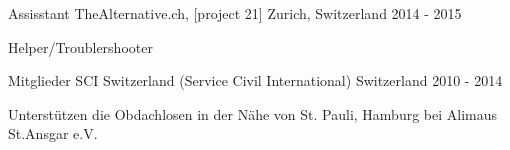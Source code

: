 \begin{cventries}
\cventry
    {Assisstant} %
    {TheAlternative.ch, [project 21]} %
    {Zurich, Switzerland} %
    {2014 - 2015} %
    {
      \begin{cvitems} %
        \item {Helper/Troublershooter}
      \end{cvitems}
    }


\cventry
	{Mitglieder} %
	{SCI Switzerland (Service Civil International)} %
	{Switzerland} %
	{2010 - 2014} %
	{
		\begin{cvitems} %
			\item {Unterstützen die Obdachlosen in der Nähe von St. Pauli, Hamburg bei Alimaus St.Ansgar e.V.}
		\end{cvitems}
	}



\end{cventries}
